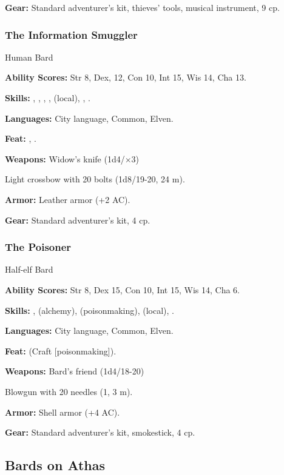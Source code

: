 \textbf{Gear:} Standard adventurer's kit, thieves' tools, musical instrument, 9 cp.

\subsubsection{The Information Smuggler}
Human Bard

\textbf{Ability Scores:} Str 8, Dex, 12, Con 10, Int 15, Wis 14, Cha 13.

\textbf{Skills:} , , , ,  (local), , .

\textbf{Languages:} City language, Common, Elven.

\textbf{Feat:} , .

\textbf{Weapons:} Widow's knife (1d4/$\times$3)

Light crossbow with 20 bolts (1d8/19-20, 24 m).

\textbf{Armor:} Leather armor (+2 AC).

\textbf{Gear:} Standard adventurer's kit, 4 cp.

\subsubsection{The Poisoner}
Half-elf Bard

\textbf{Ability Scores:} Str 8, Dex 15, Con 10, Int 15, Wis 14, Cha 6.

\textbf{Skills:} ,  (alchemy),  (poisonmaking),  (local), .

\textbf{Languages:} City language, Common, Elven.

\textbf{Feat:}  (Craft [poisonmaking]).

\textbf{Weapons:} Bard's friend (1d4/18-20)

Blowgun with 20 needles (1, 3 m).

\textbf{Armor:} Shell armor (+4 AC).

\textbf{Gear:} Standard adventurer's kit, smokestick, 4 cp.


\subsection{Bards on Athas}

